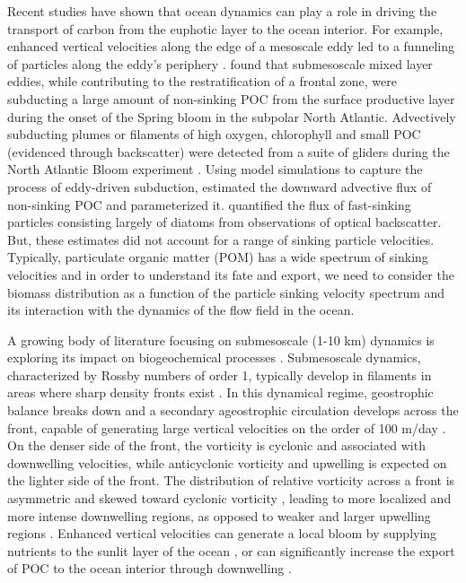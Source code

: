 \documentclass[article,linenumbers]{agujournal2018}
\begin{document}
Recent studies have shown that ocean dynamics can play a role in driving the transport of carbon from the euphotic layer to the ocean interior.  For example, enhanced vertical velocities along the edge of a mesoscale eddy led to a funneling of particles along the eddy's periphery \citep{vanHaren_2006, Waite_2016}.  
\cite{Omand_2015}  found that submesoscale mixed layer eddies, while contributing to the restratification of a frontal zone, were subducting a large amount of non-sinking POC from the surface productive layer during the onset of the Spring bloom in the subpolar North Atlantic. Advectively subducting plumes or filaments of high oxygen, chlorophyll and small POC (evidenced through backscatter) were detected from a suite of gliders during the North Atlantic Bloom experiment \citep{Alkire_2012}. Using model simulations to capture the process of eddy-driven subduction, \cite{Omand_2015} estimated the downward advective flux of non-sinking POC and parameterized it. \cite{Briggs_2011} quantified the flux of fast-sinking particles consisting largely of diatoms from observations of optical backscatter. But, these estimates did not account for a range of sinking particle velocities.  Typically, particulate organic matter (POM) has a wide spectrum of sinking velocities and in order to understand its fate and export, we need to consider the biomass distribution as a function of the particle sinking velocity spectrum and its interaction with the dynamics of the flow field in the ocean.

A growing body of literature focusing on submesoscale (1-10 km) dynamics is exploring its impact on biogeochemical processes \citep{Levy_2012,Mahadevan_2016}. Submesoscale dynamics, characterized by Rossby numbers of order 1, typically develop in filaments in areas where sharp density fronts exist \citep{Thomas_2013b,Klein_2009,McWilliams_2016}. In this dynamical regime, geostrophic balance breaks down and a secondary ageostrophic circulation develops across the front, capable of generating large vertical velocities on the order of 100 m/day \citep{FoxKemper_2008,Mahadevan_2016}. On the denser side of the front, the vorticity is cyclonic and associated with downwelling velocities, while anticyclonic vorticity and upwelling is expected on the lighter side of the front. The distribution of relative vorticity across a front is asymmetric and skewed toward cyclonic vorticity \citep{Rudnick_2001}, leading to more localized and more intense downwelling regions, as opposed to weaker and larger upwelling regions \citep{Mahadevan_2006}. Enhanced vertical velocities can generate a local bloom by supplying nutrients to the sunlit layer of the ocean \citep{Mahadevan_2000,Levy_2001}, or can significantly increase the export of POC to the ocean interior through downwelling \citep{Levy_2012, Gruber_2011,Estapa_2015,Omand_2015}.
\end{document}
